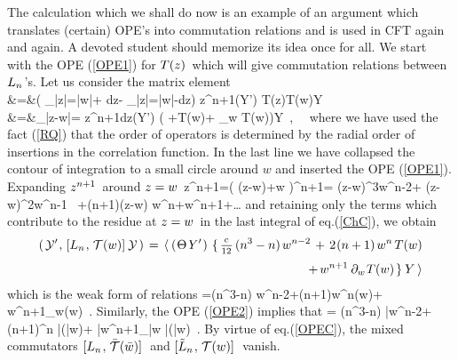 The calculation which we shall do now is an example
of an argument which translates (certain) OPE's into commutation
relations and is used in CFT again and again.
A devoted student should memorize its idea once for all.
We start with the OPE (\ref{OPE1}) for
\s$T(z)\hspace{0.05cm}$ which will give commutation relations
between \s$L_n\hspace{0.025cm}$'s. \s Let us consider
the matrix element
\qq{}\\
  &=&\left( \oint_{|z|=|w|+\epsilon}
     \hs{-0.2cm}dz\s -\m
     \oint_{|z|=|w|-\epsilon}\hs{-0.2cm}dz\right)
     \m  z^{n+1}\s\s\langle\s(\Theta Y')\s
     \s T(z)\s\s T(w)\s\s Y\s\rangle\\
  &=&\s\oint_{|z-w|=\epsilon}\hs{-0.2cm}
    z^{n+1}\s dz\s\s\langle\s(\Theta Y')\s
    \s\s(\m{}
    +\s T(w)\m+\s
    \partial_w T(w)\m)\s\s Y\s\rangle\ ,\ \
\label{ChC}
\qqq
where we have used the fact (\ref{RQ}) that the order of
operators is determined by the radial order of insertions
in the correlation function. In the last line
we have collapsed the contour of integration to a small
circle around $w$ and inserted the OPE (\ref{OPE1}).
Expanding \s$z^{n+1}\hspace{0.05cm}$ around \s$z=w\hspace{0.05cm}$
\qq
  z^{n+1}\s=\s\left( (z-w)+w \right)^{n+1}\s=\s
  \s(z-w)^3\s w^{n-2}\s+
  \s(z-w)^2\s w^{n-1}\ \cr
  +\s(n+1)\s(z-w)\s
  w^n\s+\s w^{n+1}\s+\s\dots
  \nonumber
\qqq
and retaining only the terms which
contribute to the residue at \s$z=w\hspace{0.05cm}$ in the last
integral of eq.\s\s(\ref{ChC}),  we obtain
\begin{eqnarray*}
(\s\CY'\m,\s[L_n\m,\s\CT(w)]\m\s\CY\s)\s=\s
\langle\m\s(\m\Theta\s Y'\m)\s\s\m\{\s\frac{_c}{^{12}}\s(n^3-n)\s
w^{n-2}\s+\s2\m(n+1)\s w^{n}\s T(w)\\
+\s w^{n+1}\s\m\partial_w\m T(w)\s\}\s\m Y\m\s\rangle
\end{eqnarray*}
\vs-0.3cm
\no which is the weak form of relations
\qq
[L_n\m,\s\CT(w)]\s=\s{}\s(n^3-n)\s
w^{n-2}\s+\m(n+1)\s w^{n}\s\CT(w)\s+\s
w^{n+1}\s\m\partial_w\m\CT(w)\ .\hs{0.5cm}
\label{CoMm}
\qqq
Similarly, the OPE (\ref{OPE2}) implies that
\s=
\s{}\s(n^3-n)\s
{\bar w}^{n-2}\s+\m(n+1)^{n}\s
{\bar\CT}(\bar w)\s+\s
{\bar w}^{n+1}\s\m\partial_{\bar w}\m
{\bar\CT}(\bar w)\ .\hs{0.5cm}
\label{barCoMm}
\qqq
By virtue of eq.\s\s(\ref{OPEC}), the mixed commutators
\s\s$[L_n\m,\s{\bar\CT}(\bar w)]\s\s$ and
\s\s$[\tilde L_n\m,\s\CT(w)]\s\s$ vanish.
\vs 0.6cm

